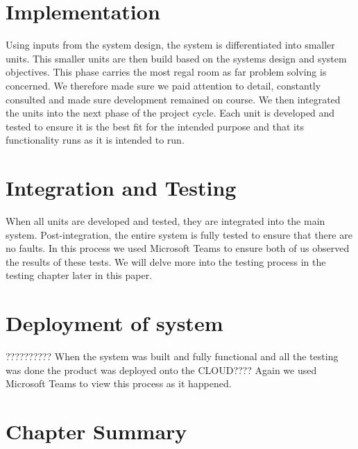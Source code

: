 \section{Implementation}

Using inputs from the system design, the system is differentiated into smaller units. This smaller units are then build based on the systems design and system objectives. This phase carries the most regal room as far problem solving is concerned. We therefore made sure we paid attention to detail, constantly consulted and made sure development remained on course. We then integrated the units into the next phase of the project cycle. Each unit is developed and tested to ensure it is the best fit for the intended purpose and that its functionality runs as it is intended to run. 

\section{Integration and Testing}

When all units are developed and tested, they are integrated into the main system. Post-integration, the entire system is fully tested to ensure that there are no faults. In this process we used Microsoft Teams to ensure both of us observed the results of these tests. We will delve more into the testing process in the testing chapter later in this paper.

\section{Deployment of system}
??????????
When the system was built and fully functional and all the testing was done the product was deployed onto the CLOUD???? Again we used Microsoft Teams to view this process as it happened.

\section{Chapter Summary} 













